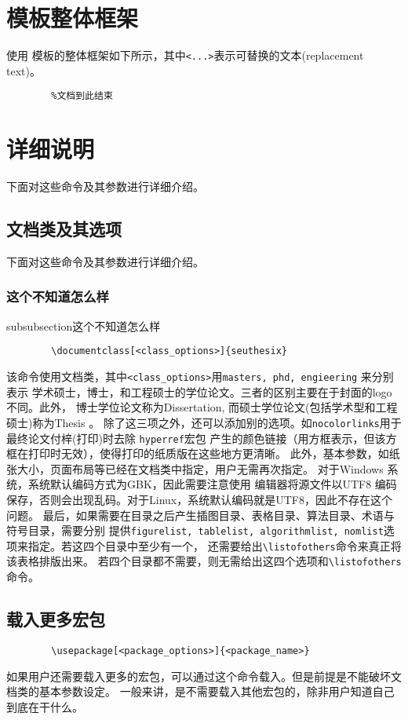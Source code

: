 \documentclass[figurelist,tablelist,algorithmlist,nomlist,masters]{seuthesix}
\begin{document}
	\section{模板整体框架}
	使用 \seuthesix 模板的整体框架如下所示，其中\verb+<...>+表示可替换的文本(replacement text)。
	{\color{magenta}
		\begin{verbatim}
		%文档到此结束
		\end{verbatim}
	}
	
	\section{详细说明}
	下面对这些命令及其参数进行详细介绍。
	\subsection{文档类及其选项}
	下面对这些命令及其参数进行详细介绍。
	\subsubsection{这个不知道怎么样}
	subsubsection{这个不知道怎么样}
	
	{\color{magenta}
		\begin{verbatim}
		\documentclass[<class_options>]{seuthesix}
		\end{verbatim}
	}
	该命令使用\seuthesix 文档类，其中\verb+<class_options>+用\texttt{masters, phd, engieering} 来分别表示
	学术硕士，博士，和工程硕士的学位论文。三者的区别主要在于封面的logo 不同。此外，
	博士学位论文称为Dissertation, 而硕士学位论文(包括学术型和工程硕士)称为Thesis 。
	除了这三项之外，还可以添加别的选项。如{\texttt{nocolorlinks}}用于最终论文付梓(打印)时去除
	\texttt{hyperref}宏包
	产生的颜色链接（用方框表示，但该方框在打印时无效），使得打印的纸质版在这些地方更清晰。
	此外，基本参数，如纸张大小，页面布局等已经在文档类中指定，用户无需再次指定。
	对于Windows 系统，系统默认编码方式为GBK，因此需要注意使用
	编辑器将源文件以UTF8 编码保存，否则会出现乱码。对于Linux，系统默认编码就是UTF8，因此不存在这个问题。
	最后，如果需要在目录之后产生插图目录、表格目录、算法目录、术语与符号目录，需要分别
	提供\texttt{figurelist, tablelist, algorithmlist, nomlist}选项来指定。若这四个目录中至少有一个，
	还需要给出\verb+\listofothers+命令来真正将该表格排版出来。
	若四个目录都不需要，则无需给出这四个选项和\verb+\listofothers+命令。
	\subsection{载入更多宏包}
	{\color{magenta}
		\begin{verbatim}
		\usepackage[<package_options>]{<package_name>}
		\end{verbatim}
	}
	如果用户还需要载入更多的宏包，可以通过这个命令载入。但是前提是不能破坏\seuthesix 文档类的基本参数设定。
	一般来讲，是不需要载入其他宏包的，除非用户知道自己到底在干什么。
	
\end{document}
